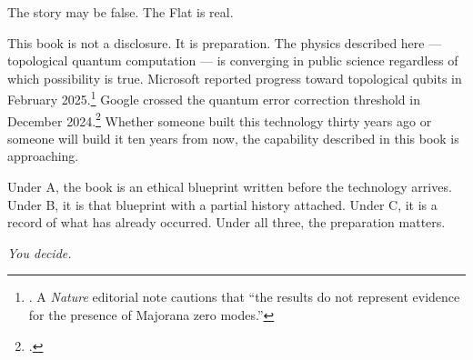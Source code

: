 The story may be false. The Flat is real.

\vspace{0.5cm}

This book is not a disclosure. It is preparation. The physics described here --- topological quantum computation --- is converging in public science regardless of which possibility is true. Microsoft reported progress toward topological qubits in February 2025.\footnote{\cite{microsoft2025}. A \textit{Nature} editorial note cautions that ``the results do not represent evidence for the presence of Majorana zero modes.''} Google crossed the quantum error correction threshold in December 2024.\footcite{google2025} Whether someone built this technology thirty years ago or someone will build it ten years from now, the capability described in this book is approaching.

Under A, the book is an ethical blueprint written before the technology arrives. Under B, it is that blueprint with a partial history attached. Under C, it is a record of what has already occurred. Under all three, the preparation matters.

\vspace{1cm}

\begin{center}
\textit{You decide.}
\end{center}

\chapterreturn
